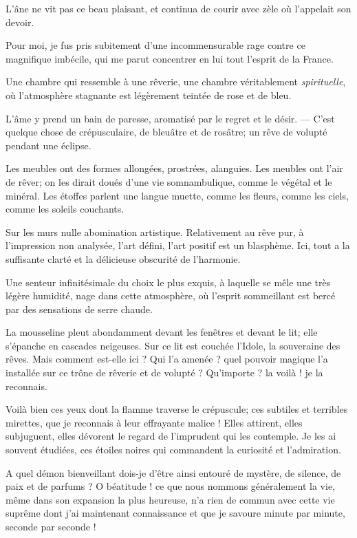 L’âne ne vit pas ce beau plaisant, et continua de
courir avec zèle où l’appelait son devoir.

Pour moi, je fus pris subitement d’une incommensurable
rage contre ce magnifique imbécile, qui me parut concentrer en lui tout
l’esprit de la France.



Une chambre qui ressemble à une rêverie, une chambre véritablement
\textit{spirituelle}, où l’atmosphère stagnante est légèrement
teintée de rose et de bleu.

L’âme y prend un bain de paresse, aromatisé par le
regret et le désir. --- C’est quelque chose de
crépusculaire, de bleuâtre et de rosâtre; un rêve de volupté pendant
une éclipse.

Les meubles ont des formes allongées, prostrées, alanguies. Les meubles
ont l’air de rêver; on les dirait doués
d’une vie somnambulique, comme le végétal et le
minéral. Les étoffes parlent une langue muette, comme les fleurs, comme
les ciels, comme les soleils couchants.

Sur les murs nulle abomination artistique. Relativement au rêve pur, à
l’impression non analysée, l’art
défini, l’art positif est un blasphème. Ici, tout a la
suffisante clarté et la délicieuse obscurité de
l’harmonie.

Une senteur infinitésimale du choix le plus exquis, à laquelle se mêle
une très légère humidité, nage dans cette atmosphère, où
l’esprit sommeillant est bercé par des sensations de
serre chaude.

La mousseline pleut abondamment devant les fenêtres et devant le lit;
elle s’épanche en cascades neigeuses. Sur ce lit est
couchée l’Idole, la souveraine des rêves. Mais comment
est{}-elle ici ? Qui l’a amenée ? quel pouvoir magique
l’a installée sur ce trône de rêverie et de volupté ?
Qu’importe ? la voilà ! je la reconnais.

Voilà bien ces yeux dont la flamme traverse le crépuscule; ces subtiles
et terribles mirettes, que je reconnais à leur effrayante malice !
Elles attirent, elles subjuguent, elles dévorent le regard de
l’imprudent qui les contemple. Je les ai souvent
étudiées, ces étoiles noires qui commandent la curiosité et
l’admiration.

A quel démon bienveillant dois{}-je d’être ainsi
entouré de mystère, de silence, de paix et de parfums ? O béatitude !
ce que nous nommons généralement la vie, même dans son expansion la
plus heureuse, n’a rien de commun avec cette vie
suprême dont j’ai maintenant connaissance et que je
savoure minute par minute, seconde par seconde !

